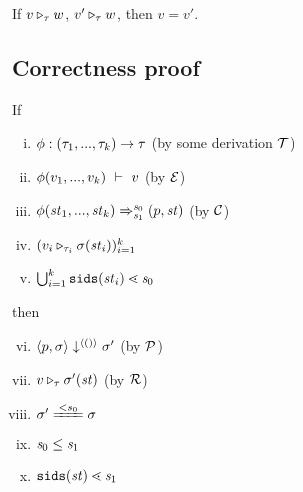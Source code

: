 \begin{lem}
	If $\ValRep{v}{\tau}{w}$, $\ValRep{v'}{\tau}{w}$,
	then $v=v'$.
\end{lem}


\subsection{Correctness proof}

\begin{lem}
	\label{function-correctness}
	If 
	\begin{enumerate}[(i)]
	\item $\Typef{\hcall}{\replc{k}{\tau}}\tau$ (by some derivation $\MT$)
	\item $\EvalF{\hcall}{\replc{k}{v}}{v}$ (by $\ME$)
	\item $\Transf{\hcall}{\replc k {\st}} {\s_0} {\s_1} {\sfun{p}{\st}}$ (by $\MC$)
 	\item $(\ValRep{v_i}{\tau_i}{\sgm(\st_i)})^k_{i=1}$
 	\item $\bigcup^k_{i=1}\sids{\st_i} \.< \s_0$
	\end{enumerate}
 	then 
 	\begin{enumerate}[(i)]
 		\setcounter{enumi}{5}
 		\item $\seval{p}{\sgm}{\vunit}{\sgm'}$ (by $\MP$)
 		\item $\ValRep{v}{\tau}{\sgm'(\st)}$ (by $\MR$)
 		\item $\sgm' \ConEq{s_0} \sgm $
 	    \item $\s_0 \le \s_1$
 		\item $\sids{\st} \.< \s_1$

 	\end{enumerate}
\end{lem}

